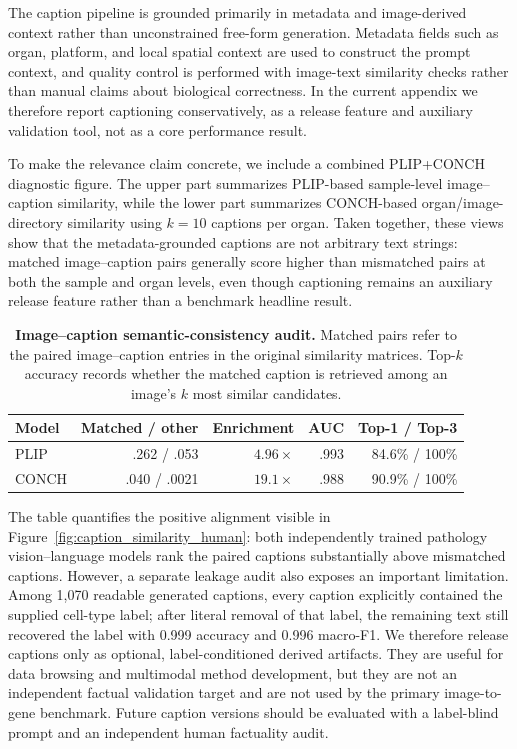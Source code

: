 \documentclass[sigconf,review]{acmart}
\begin{document}
The caption pipeline is grounded primarily in metadata and image-derived context rather than unconstrained free-form generation. Metadata fields such as organ, platform, and local spatial context are used to construct the prompt context, and quality control is performed with image-text similarity checks rather than manual claims about biological correctness. In the current appendix we therefore report captioning conservatively, as a release feature and auxiliary validation tool, not as a core performance result.

To make the relevance claim concrete, we include a combined PLIP+CONCH diagnostic figure. The upper part summarizes PLIP-based sample-level image--caption similarity, while the lower part summarizes CONCH-based organ/image-directory similarity using $k=10$ captions per organ. Taken together, these views show that the metadata-grounded captions are not arbitrary text strings: matched image--caption pairs generally score higher than mismatched pairs at both the sample and organ levels, even though captioning remains an auxiliary release feature rather than a benchmark headline result.

\begin{table}[t]
\centering
\small
\setlength{\tabcolsep}{3.2pt}
\caption{\textbf{Image--caption semantic-consistency audit.} Matched pairs
refer to the paired image--caption entries in the original similarity
matrices. Top-$k$ accuracy records whether the matched caption is retrieved
among an image's $k$ most similar candidates.}
\label{tab:image_caption_alignment}
\begin{tabular}{@{}lrrrr@{}}
\toprule
Model & Matched / other & Enrichment & AUC & Top-1 / Top-3 \\
\midrule
PLIP  & .262 / .053  & $4.96\times$ & .993 & 84.6\% / 100\% \\
CONCH & .040 / .0021 & $19.1\times$ & .988 & 90.9\% / 100\% \\
\bottomrule
\end{tabular}
\end{table}

The table quantifies the positive alignment visible in
Figure~\ref{fig:caption_similarity_human}: both independently trained
pathology vision--language models rank the paired captions substantially above
mismatched captions. However, a separate leakage audit also exposes an
important limitation. Among 1,070 readable generated captions, every caption
explicitly contained the supplied cell-type label; after literal removal of
that label, the remaining text still recovered the label with 0.999 accuracy
and 0.996 macro-F1. We therefore release captions only as optional,
label-conditioned derived artifacts. They are useful for data browsing and
multimodal method development, but they are not an independent factual
validation target and are not used by the primary image-to-gene benchmark.
Future caption versions should be evaluated with a label-blind prompt and an
independent human factuality audit.
\end{document}

